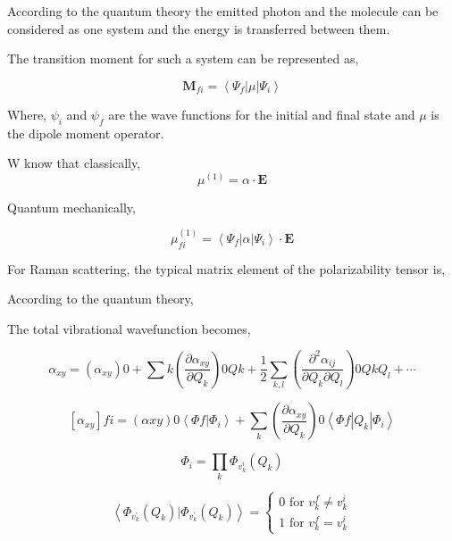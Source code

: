 \documentclass[openany,11pt,a4paper]{report}
\begin{document}
According to the quantum theory the emitted photon and the molecule can be considered as one system and the energy is transferred between them. 

The transition moment for such a system can be represented as,

\begin{equation}
\mathbf{M}_{f i}=\left\langle\Psi_{f}|\mu| \Psi_{i}\right\rangle
\end{equation} 

Where, $\psi_{i}$ and $\psi_{f}$ are the wave functions for the initial and final state and $\mu$ is the dipole moment operator. 

W know that classically,
\begin{equation}
\mu^{(1)}=\alpha \cdot \mathbf{E}
\end{equation}

Quantum mechanically,

$$
\mu_{f i}^{(1)}=\left\langle\Psi_{f}|\alpha| \Psi_{i}\right\rangle \cdot \mathbf{E}
$$

For Raman scattering, the typical matrix element of the polarizability tensor is, 



According to the quantum theory,

The total vibrational wavefunction becomes, 

\begin{equation}
\alpha_{x y}=\left(\alpha_{x y}\right){0}+\sum{k}\left(\frac{\partial \alpha_{x y}}{\partial Q_{k}}\right){0} Q{k}+\frac{1}{2} \sum_{k, l}\left(\frac{\partial^{2} \alpha_{i j}}{\partial Q_{k} \partial Q_{l}}\right){0} Q{k} Q_{l}+\cdots
\end{equation}

\begin{equation}
\left[\alpha_{x y}\right]{f i}=\left(\alpha{x y}\right){0}\left\langle\Phi{f} | \Phi_{i}\right\rangle+\sum_{k}\left(\frac{\partial \alpha_{x y}}{\partial Q_{k}}\right){0}\left\langle\Phi{f}\left|Q_{k}\right| \Phi_{i}\right\rangle
\end{equation}

\begin{equation}
\Phi_{i}=\prod_{k} \Phi_{v_{k}^{i}}\left(Q_{k}\right)
\end{equation}

\begin{equation}
\left\langle\Phi_{v_{k}^{\prime}}\left(Q_{k}\right) | \Phi_{v_{k}^{\prime}}\left(Q_{k}\right)\right\rangle=\left\{\begin{array}{l}{0 \text { for } v_{k}^{f} \neq v_{k}^{i}} \\ {1 \text { for } v_{k}^{f}=v_{k}^{i}}\end{array}\right.
\end{equation}
\end{document}
